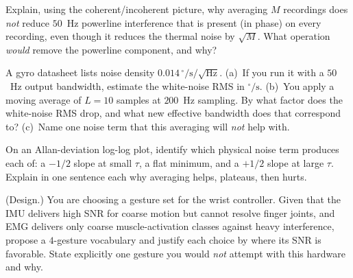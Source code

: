 \begin{exercise}
Explain, using the coherent/incoherent picture, why averaging $M$ recordings does
\emph{not} reduce $50$~Hz powerline interference that is present (in phase) on
every recording, even though it reduces the thermal noise by $\sqrt M$. What
operation \emph{would} remove the powerline component, and why?
\end{exercise}

\begin{exercise}
A gyro datasheet lists noise density $0.014\,^{\circ}/\text{s}/\sqrt{\text{Hz}}$.
(a)~If you run it with a $50$~Hz output bandwidth, estimate the white-noise RMS
in $^{\circ}/\text{s}$. (b)~You apply a moving average of $L=10$ samples at
$200$~Hz sampling. By what factor does the white-noise RMS drop, and what new
effective bandwidth does that correspond to? (c)~Name one noise term that this
averaging will \emph{not} help with.
\end{exercise}

\begin{exercise}
On an Allan-deviation log-log plot, identify which physical noise term produces
each of: a $-1/2$ slope at small $\tau$, a flat minimum, and a $+1/2$ slope at
large $\tau$. Explain in one sentence each why averaging helps, plateaus, then
hurts.
\end{exercise}

\begin{exercise}
(Design.) You are choosing a gesture set for the wrist controller. Given that the
IMU delivers high SNR for coarse motion but cannot resolve finger joints, and EMG
delivers only coarse muscle-activation classes against heavy interference,
propose a $4$-gesture vocabulary and justify each choice by where its SNR is
favorable. State explicitly one gesture you would \emph{not} attempt with this
hardware and why.
\end{exercise}
